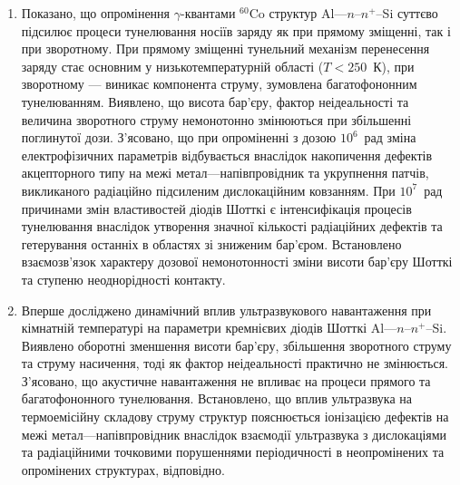 \begin{enumerate}[leftmargin=0cm,itemindent=3em]
\item
     Показано, що опромінення $\gamma$-квантами $^{60}$Co структур Al---$n$--$n^+$--Si суттєво підсилює процеси тунелювання носіїв заряду як при прямому зміщенні, так і при зворотному.
     При прямому зміщенні тунельний механізм перенесення заряду стає основним у низькотемпературній області ($T<250$~К),
 при зворотному --- виникає компонента струму, зумовлена багатофононним тунелюванням.
 Виявлено, що висота бар'єру, фактор неідеальності та величина зворотного струму немонотонно змінюються при збільшенні поглинутої дози.
З'ясовано, що при опроміненні з дозою $10^6$~рад зміна
електрофізичних
параметрів відбувається внаслідок накопичення дефектів акцепторного типу на межі метал---напівпровідник та укрупнення патчів, викликаного радіаційно підсиленим дислокаційним ковзанням.
При
$10^7$~рад
  причинами змін властивостей діодів Шотткі є інтенсифікація процесів тунелювання внаслідок утворення значної кількості радіаційних дефектів та гетерування останніх в областях зі зниженим бар'єром.
Встановлено взаємозв'язок характеру дозової немонотонності зміни висоти бар'єру Шотткі та ступеню неоднорідності контакту.


\item
Вперше досліджено динамічний вплив ультразвукового навантаження при кімнатній температурі на параметри кремнієвих діодів Шотткі Al---$n$--$n^+$--Si.
Виявлено
оборотні зменшення висоти бар'єру,
збільшення зворотного струму та струму насичення, тоді як фактор неідеальності практично не змінюється.
З'ясовано, що акустичне навантаження не впливає на процеси прямого та багатофононного тунелювання.
Встановлено, що вплив ультразвука на термоемісійну складову струму структур пояснюється іонізацією дефектів на межі метал---напівпровідник
  внаслідок взаємодії ультразвука з дислокаціями та радіаційними точковими порушеннями періодичності в неопромінених та опромінених структурах, відповідно.


\end{enumerate}
